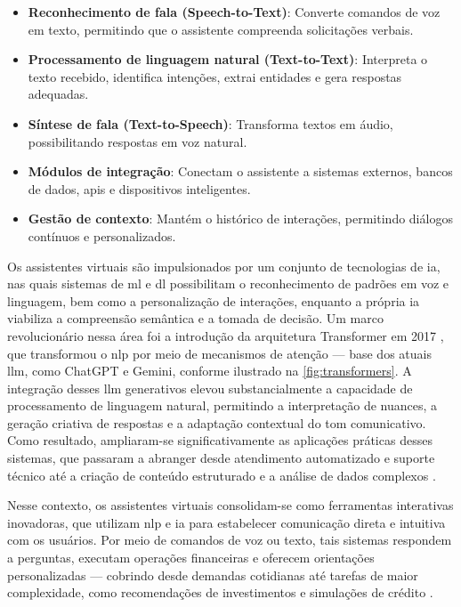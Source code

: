 \begin{itemize}
  \item \textbf{Reconhecimento de fala (Speech-to-Text)}: Converte comandos de voz em texto, permitindo que o assistente compreenda solicitações verbais.
    \item \textbf{Processamento de linguagem natural (Text-to-Text)}: Interpreta o texto recebido, identifica intenções, extrai entidades e gera respostas adequadas.
    \item \textbf{Síntese de fala (Text-to-Speech)}: Transforma textos em áudio, possibilitando respostas em voz natural.
    \item \textbf{Módulos de integração}: Conectam o assistente a sistemas externos, bancos de dados, \gls{api}s e dispositivos inteligentes.
    \item \textbf{Gestão de contexto}: Mantém o histórico de interações, permitindo diálogos contínuos e personalizados.
\end{itemize}

Os assistentes virtuais são impulsionados por um conjunto de tecnologias de \acrfull{ia}, nas quais sistemas de \gls{ml} e \gls{dl} possibilitam o reconhecimento de padrões em voz e linguagem, bem como a personalização de interações, enquanto a própria \gls{ia} viabiliza a compreensão semântica e a tomada de decisão. Um marco revolucionário nessa área foi a introdução da arquitetura Transformer em 2017 \cite{vaswani_attention_2017}, que transformou o \gls{nlp} por meio de mecanismos de atenção — base dos atuais \gls{llm}, como ChatGPT e Gemini, conforme ilustrado na \autoref{fig:transformers}. A integração desses \gls{llm} generativos elevou substancialmente a capacidade de processamento de linguagem natural, permitindo a interpretação de nuances, a geração criativa de respostas e a adaptação contextual do tom comunicativo. Como resultado, ampliaram-se significativamente as aplicações práticas desses sistemas, que passaram a abranger desde atendimento automatizado e suporte técnico até a criação de conteúdo estruturado e a análise de dados complexos \cite{mckinsey_economic_2023}.

Nesse contexto, os assistentes virtuais consolidam-se como ferramentas interativas inovadoras, que utilizam \gls{nlp} e \gls{ia} para estabelecer comunicação direta e intuitiva com os usuários. Por meio de comandos de voz ou texto, tais sistemas respondem a perguntas, executam operações financeiras e oferecem orientações personalizadas — cobrindo desde demandas cotidianas até tarefas de maior complexidade, como recomendações de investimentos e simulações de crédito \cite{cruz_assistentes_2018}.

